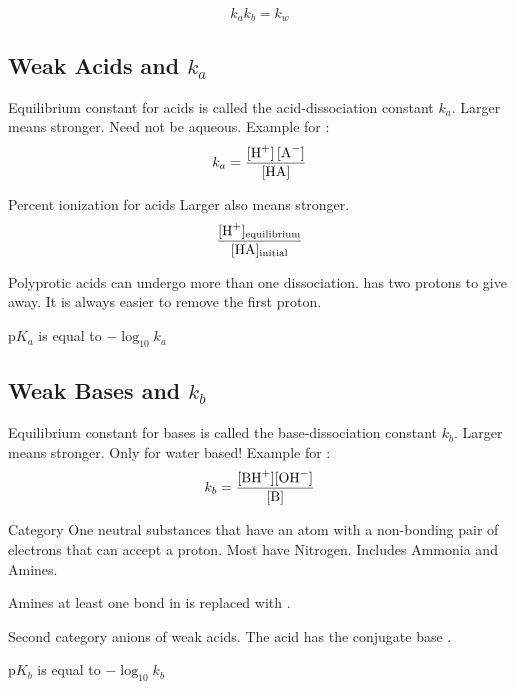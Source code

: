 \begin{mdframed}
\begin{multicols}{2}
\[k_a k_b = k_w\]

\subsection{Weak Acids and $k_a$}
\begin{compactdesc}
    \item[Equilibrium constant for acids] is called the acid-dissociation
        constant $k_a$. Larger means stronger. Need not be aqueous.
        Example for :
        \[ k_a = \frac{\ce{[H+] [A^-]}}{\ce{[HA]}} \]

    \item[Percent ionization for acids] Larger also means stronger.
        \[\frac{\ce{[H+]_{equilibrium}}}{\ce{[HA]_{initial}}}\]
    \item[Polyprotic acids] can undergo more than one dissociation. 
        has two protons to give away. It is always easier to remove the first
        proton.
    \item[p$K_a$] is equal to $-\log_{10} k_a$
\end{compactdesc}

\subsection{Weak Bases and $k_b$}
\begin{compactdesc}
     \item[Equilibrium constant for bases] is called the base-dissociation
        constant $k_b$. Larger means stronger. Only for water based!
        Example for :
        \[ k_b = \frac{\ce{[BH+][OH^-]}}{\ce{[B]}} \]
    \item[Category One] neutral substances that have an atom with a non-bonding
        pair of electrons that can accept a proton. Most have Nitrogen.
        Includes Ammonia and Amines.
    \item[Amines] at least one  bond in  is replaced with
        .
    \item[Second category] anions of weak acids. The acid  has
        the conjugate base .
    \item[p$K_b$] is equal to $-\log_{10} k_b$
\end{compactdesc}

\end{multicols}
\end{mdframed}




